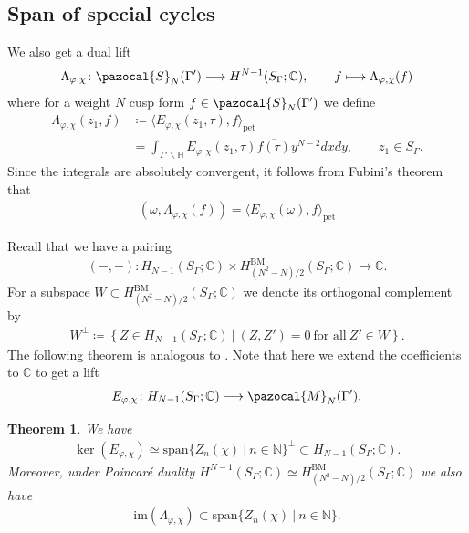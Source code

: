 \documentclass[a4paper,11pt]{amsart} %
\newcommand{\8}{\infty}
\newcommand{\NN}{\mathbb{N}}
\newcommand{\vbf}{\mathbf{v}}
\newcommand{\Span}{\mathrm{span}}
\newcommand{\BM}{\mathrm{BM}}
\newcommand{\HH}{\mathbb{H}}
\newcommand{\C}{\mathbb{C}}
\newcommand{\Scal}{\pazocal{S}}
\newcommand{\pet}{\mathrm{pet}}
\newcommand{\image}{\mathrm{im}}
\newcommand{\Mcal}{\pazocal{M}}
\theoremstyle{mytheoremstyle}
\newtheorem{thm}{Theorem}[section]
\theoremstyle{remark}
\newtheorem{rmk}{Remark}[section]
\numberwithin{equation}{section}
\begin{document}

\subsection{Span of special cycles} We also get a dual lift
\begin{align}
 \Lambda_{\varphi, \chi} \colon \Scal_N(\Gamma') \longrightarrow   H^{N-1}(S_\Gamma;\C), \qquad
 f \longmapsto \Lambda_{\varphi, \chi}(f)
\end{align}
where for a weight $N$ cusp form $f \in \Scal_N(\Gamma')$ we define
\begin{align}
\Lambda_{\varphi, \chi}(z_1,f) & \coloneqq  \langle E_{\varphi, \chi}(z_1,\tau),f\rangle_{\pet} \nonumber \\
& = \int_{\Gamma'\backslash \HH} E_{\varphi, \chi}(z_1,\tau) \overline{f(\tau)}y^{N-2} dxdy, \qquad z_1\in S_\Gamma.
\end{align}
Since the integrals are absolutely convergent, it follows from Fubini's theorem that
\begin{align}
\left ( \omega, \Lambda_{\varphi, \chi}(f) \right )= \langle E_{\varphi, \chi}(\omega),f\rangle_{\pet}
\end{align}

Recall that we have a pairing
\begin{align}
(-,- ) \colon H_{N-1}(S_\Gamma;\C) \times H^{\BM}_{(N^2-N)/2}(S_\Gamma;\C) \longrightarrow \C.
\end{align}
For a subspace $W \subset H^{\BM}_{(N^2-N)/2}(S_\Gamma;\C)$ we denote its orthogonal complement by
\begin{align}
W^\perp \coloneqq \left \{ Z \in H_{N-1}(S_\Gamma;\C)  \ \vert  \ ( Z,Z')=0 \ \textrm{for all} \ Z' \in W \right \}.
\end{align}
The following theorem is analogous to  \cite[Theorem.~4.5]{kmcjm}. Note that here we extend the coefficients to $\C$ to get a lift
\begin{align}
E_{\varphi, \chi} \colon H_{N-1}(S_\Gamma;\C) \longrightarrow \Mcal_N(\Gamma').
\end{align}
\begin{thm} \label{theoremC416} We have
\begin{align}
\ker(E_{\varphi, \chi}) \simeq \Span \{Z_n(\chi) \ \vert \ n \in \NN \}^\perp \subset H_{N-1}(S_\Gamma;\C).
\end{align}
Moreover,  under Poincaré duality $H^{N-1}(S_\Gamma;\C) \simeq H^{\BM}_{(N^2-N)/2}(S_\Gamma;\C)$ we also have
\begin{align}
\image(\Lambda_{\varphi, \chi}) \subset \Span \{Z_n(\chi) \ \vert \ n \in \NN \}.
\end{align}
\end{thm}
\end{document}
